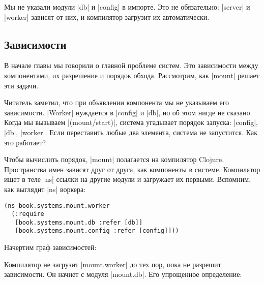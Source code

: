 Мы не указали модули \spverb|db| и \spverb|config| в импорте. Это не
обязательно: \spverb|server| и \spverb|worker| зависят от них, и компилятор
загрузит их автоматически.

\subsection{Зависимости}

В начале главы мы говорили о главной проблеме систем. Это зависимости между
компонентами, их разрешение и порядок обхода. Рассмотрим, как \spverb|mount|
решает эти задачи.

Читатель заметил, что при объявлении компонента мы не указываем его
зависимости. \spverb|Worker| нуждается в \spverb|config| и \spverb|db|, но об
этом нигде не сказано. Когда мы вызываем \spverb|(mount/start)|, система
угадывает порядок запуска: \spverb|config|, \spverb|db|, \spverb|worker|. Если
переставить любые два элемента, система не запустится. Как это работает?

Чтобы вычислить порядок, \spverb|mount| полагается на компилятор
Clojure. Пространства имен зависят друг от друга, как компоненты в
системе. Компилятор ищет в теле \spverb|ns| ссылки на другие модули и загружает
их первыми. Вспомним, как выглядит \spverb|ns| воркера:

\begin{verbatim}
(ns book.systems.mount.worker
  (:require
   [book.systems.mount.db :refer [db]]
   [book.systems.mount.config :refer [config]]))
\end{verbatim}

Начертим граф зависимостей:

\vspace{1em}


\vspace{1em}

Компилятор не загрузит \spverb|mount.worker| до тех пор, пока не разрешит
зависимости. Он начнет с модуля \spverb|mount.db|. Его упрощенное определение:

